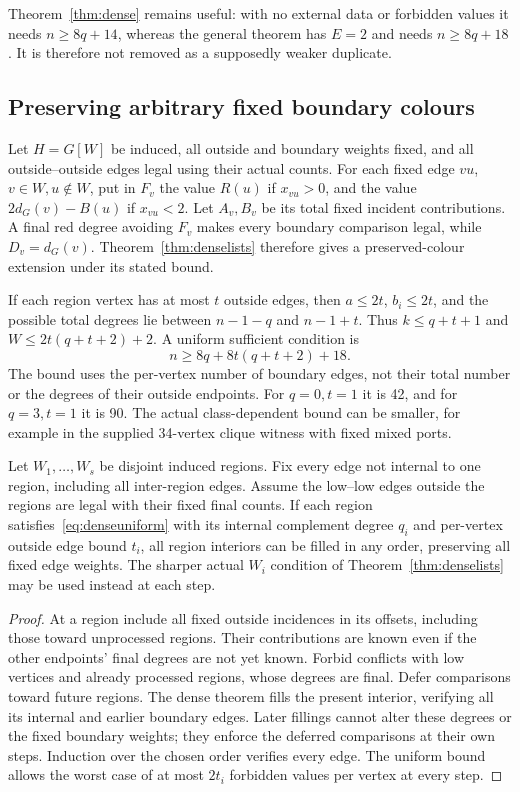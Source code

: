 Theorem~\ref{thm:dense} remains useful: with no external data or
forbidden values it needs $n\ge8q+14$, whereas the general theorem
has $E=2$ and needs $n\ge8q+18$. It is therefore not removed as
a supposedly weaker duplicate.

\subsection{Preserving arbitrary fixed boundary colours}

Let $H=G[W]$ be induced, all outside and boundary weights fixed,
and all outside--outside edges legal using their actual counts.
For each fixed edge $vu$, $v\in W,u\notin W$, put in $F_v$
the value $R(u)$ if $x_{vu}>0$, and the value
$2d_G(v)-B(u)$ if $x_{vu}<2$. Let $A_v,B_v$ be its total fixed
incident contributions. A final red degree avoiding $F_v$ makes
every boundary comparison legal, while $D_v=d_G(v)$.
Theorem~\ref{thm:denselists} therefore gives a preserved-colour
extension under its stated bound.

If each region vertex has at most $t$ outside edges, then
$a\le2t$, $b_i\le2t$, and the possible total degrees lie between
$n-1-q$ and $n-1+t$. Thus $k\le q+t+1$ and
$W\le2t(q+t+2)+2$. A uniform sufficient condition is
\begin{equation}\label{eq:denseuniform}
 n\ge8q+8t(q+t+2)+18.
\end{equation}
The bound uses the per-vertex number of boundary edges, not their
total number or the degrees of their outside endpoints. For $q=0,t=1$
it is 42, and for $q=3,t=1$ it is 90. The actual class-dependent
bound can be smaller, for example in the supplied 34-vertex clique
witness with fixed mixed ports.

\begin{corollary}\label{cor:sequential}
Let $W_1,\ldots,W_s$ be disjoint induced regions. Fix every edge
not internal to one region, including all inter-region edges. Assume
the low--low edges outside the regions are legal with their fixed
final counts. If each region satisfies~\eqref{eq:denseuniform}
with its internal complement degree $q_i$ and per-vertex outside
edge bound $t_i$, all region interiors can be filled in any order,
preserving all fixed edge weights. The sharper actual $W_i$
condition of Theorem~\ref{thm:denselists} may be used instead at
each step.
\end{corollary}
\begin{proof}
At a region include all fixed outside incidences in its offsets,
including those toward unprocessed regions. Their contributions are
known even if the other endpoints' final degrees are not yet known.
Forbid conflicts with low vertices and already processed regions,
whose degrees are final. Defer comparisons toward future regions.
The dense theorem fills the present interior, verifying all its
internal and earlier boundary edges. Later fillings cannot alter
these degrees or the fixed boundary weights; they enforce the
deferred comparisons at their own steps. Induction over the chosen
order verifies every edge. The uniform bound allows the worst case
of at most $2t_i$ forbidden values per vertex at every step.
\end{proof}


